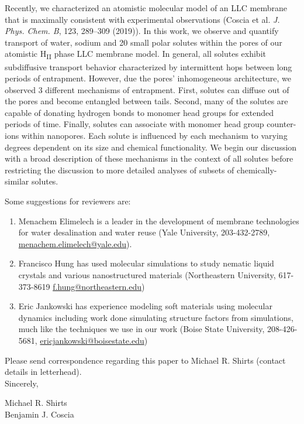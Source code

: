 \documentclass[fontsize=11pt]{article}
\begin{document}
        Recently, we characterized an atomistic molecular model of an
        LLC membrane that is maximally consistent with experimental
        observations (Coscia et al. \textit{J. Phys. Chem. B}, 123,
        289--309 (2019)). In this work, we observe and quantify
        transport of water, sodium and 20 small polar solutes within
        the pores of our atomistic H\textsubscript{II} phase LLC
        membrane model. In general, all solutes exhibit subdiffusive
        transport behavior characterized by intermittent hops between
        long periods of entrapment. However, due the pores'
        inhomogeneous architecture, we observed 3 different mechanisms
        of entrapment. First, solutes can diffuse out of the pores and
        become entangled between tails. Second, many of the solutes
        are capable of donating hydrogen bonds to monomer head groups
        for extended periods of time. Finally, solutes can associate
        with monomer head group counter-ions within nanopores. Each
        solute is influenced by each mechanism to varying degrees
        dependent on its size and chemical functionality. We begin our
        discussion with a broad description of these mechanisms in the
        context of all solutes before restricting the discussion to
        more detailed analyses of subsets of chemically-similar
        solutes.
	
	\noindent Some suggestions for reviewers are:
	\begin{enumerate}

		\item Menachem Elimelech is a leader in the development of membrane technologies
		for	water desalination and water reuse (Yale University, 203-432-2789,
		\href{mailto:menachem.elimelech@yale.edu}{menachem.elimelech@yale.edu}).
	
		\item Francisco Hung has used molecular simulations to study nematic liquid crystals
		and various	nanostructured materials (Northeastern University, 617-373-8619 	
		\href{mailto:f.hung@northeastern.edu}{f.hung@northeastern.edu})
		
		\item Eric Jankowski has experience modeling soft materials using molecular dynamics
		including work done simulating structure factors from simulations, much like
		the techniques we use in our work (Boise State University, 208-426-5681,
		\href{mailto:ericjankowski@boisestate.edu}{ericjankowski@boisestate.edu})
		
	\end{enumerate}
	
	\noindent Please send correspondence regarding this paper to Michael R. Shirts (contact
	details in letterhead).\\	
	
	\noindent Sincerely,
	
	\noindent Michael R. Shirts \\
	\noindent Benjamin J. Coscia \\
	
\end{document}
